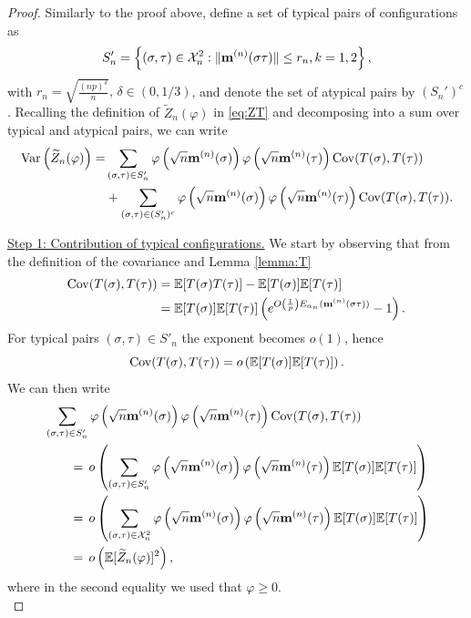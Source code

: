 \documentclass[11pt,oneside]{amsart}
\numberwithin{equation}{section}  %
\theoremstyle{plain}
\theoremstyle{remark}
\def \E {{\mathbb E}}
\def \bm {{\bf m}}
\begin{document}
\begin{proof}
Similarly to the proof above, define a set of typical pairs of configurations as
\begin{equation*}
S'_n = \left\{ (\sigma, \tau) \in \mathcal{X}_{n}^2 : \|\bm^{(n)}(\sigma\tau)\|  \le r_n, k=1,2\right\},
\end{equation*}
with $r_n = \sqrt{\frac{(np)^{\delta}}{n}}, \, \delta \in (0,1/3)$, and denote the set of atypical pairs by
$(S_n')^c$. Recalling the definition of $\widetilde{Z}_n(\varphi)$ in \eqref{eq:ZT} and decomposing into a sum over typical and atypical pairs, we can write
\begin{equation}
\label{eq:vartypicalatypical}
\begin{split}
{\rm Var}\left(\widetilde{Z}_n(\varphi)\right) = &  \sum_{(\sigma, \tau) \in S'_n} \varphi\left(\sqrt{n} \bm^{(n)}(\sigma) \right) \varphi\left(\sqrt{n} \bm^{(n)}(\tau) \right) {\rm Cov}(T(\sigma), T(\tau)) \\
& + \sum_{(\sigma, \tau) \in (S'_n)^c} \varphi\left(\sqrt{n} \bm^{(n)}(\sigma) \right) \varphi\left(\sqrt{n} \bm^{(n)}(\tau) \right) {\rm Cov}(T(\sigma), T(\tau)).
\end{split}
\end{equation}

\noindent
\underline{Step 1: Contribution of typical configurations.} We start by observing that from the definition of the covariance and Lemma \ref{lemma:T} 
\begin{equation*}
\begin{split}
\mathrm{Cov}(T(\sigma),T(\tau)) & = \E[T(\sigma)T(\tau)] - \E[T(\sigma)]\E[T(\tau)] \\
& = \E[T(\sigma)] \E[T(\tau)] \left( e^{ O\left(\frac{1}{p}\right) E_{\alpha_n}(\bm^{(n)}(\sigma\tau))} - 1 \right).
\end{split}
\end{equation*}
For typical pairs $(\sigma, \tau) \in S'_n$ the exponent becomes $o(1)$, hence
\begin{equation*}
{\rm Cov}(T(\sigma), T(\tau)) = o\left( \E[T(\sigma)] \E[T(\tau)] \right).
\end{equation*}
We can then write
\begin{equation}
\label{eq:typicalpairs}
\begin{split}
&\sum_{(\sigma, \tau) \in S'_n} \varphi\left(\sqrt{n} \bm^{(n)}(\sigma) \right) \varphi\left(\sqrt{n} \bm^{(n)}(\tau) \right) {\rm Cov}(T(\sigma), T(\tau)) \\
& \qquad =\, o \left( \sum_{(\sigma, \tau) \in S'_n} \varphi\left(\sqrt{n} \bm^{(n)}(\sigma) \right) \varphi\left(\sqrt{n} \bm^{(n)}(\tau) \right) \E[T(\sigma)] \E[T(\tau)] \right) \\
& \qquad =\, o \left( \sum_{(\sigma, \tau) \in \mathcal{X}_n^2} \varphi\left(\sqrt{n} \bm^{(n)}(\sigma) \right) \varphi\left(\sqrt{n} \bm^{(n)}(\tau) \right)  \E[T(\sigma)] \E[T(\tau)] \right) \\
& \qquad =\, o\left( \E[\widetilde{Z}_n(\varphi)]^2 \right),
\end{split}
\end{equation}
where in the second equality we used that $\varphi \geq 0$. \\


\end{proof}
\end{document}
